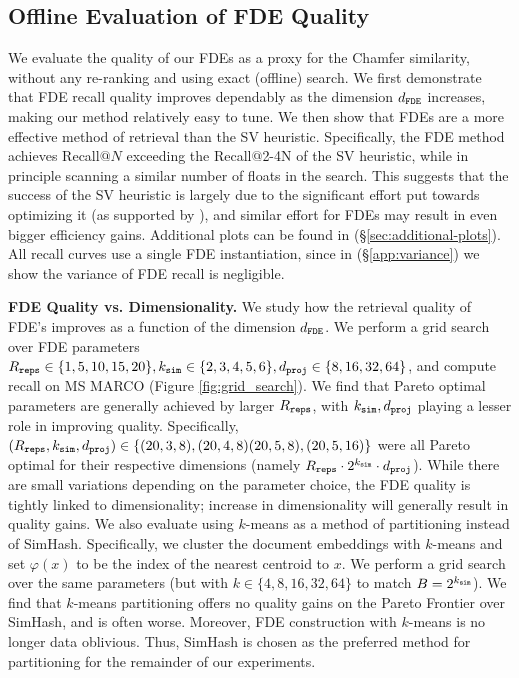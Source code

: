\subsection{Offline Evaluation of FDE Quality}
\label{sec:fde-experimental}
We evaluate the quality of our FDEs as a proxy for the Chamfer similarity, without any re-ranking and using exact (offline) search. We first demonstrate that FDE recall quality improves dependably as the dimension $d_{\texttt{FDE}}$ increases, making our method relatively easy to tune. We then show that FDEs are a more effective method of retrieval than the SV heuristic. Specifically, the FDE method achieves Recall$@N$ exceeding the Recall$@$2-4N of the SV heuristic, while in principle scanning a similar number of floats in the search. This suggests that the success of the SV heuristic is largely due to the significant effort put towards optimizing it (as supported by \cite{macavaney2024reproducibility}), and similar effort for FDEs may result in even bigger efficiency gains. Additional plots can be found in (§\ref{sec:additional-plots}). All recall curves use a single FDE instantiation, since in (§\ref{app:variance}) we show the variance of FDE recall is negligible. 



\textbf{FDE Quality vs. Dimensionality.}
We study how the retrieval quality of FDE's improves as a function of the dimension $d_{\texttt{FDE}}$. We perform a grid search over FDE parameters $R_{\texttt{reps}} \in \{1,5,10,15,20\}, k_{\texttt{sim}} \in \{2,3,4,5,6\}, d_{\texttt{proj}} \in \{8,16,32,64\}$, and compute recall on MS MARCO (Figure \ref{fig:grid_search}). We find that Pareto optimal parameters are generally achieved by larger $R_{\texttt{reps}}$, with $k_{\texttt{sim}},d_{\texttt{proj}}$ playing a lesser role in improving quality. Specifically, $(R_{\texttt{reps}},k_{\texttt{sim}},d_{\texttt{proj}}) \in\{ (20,3,8),(20,4,8)(20,5,8),(20,5,16) \}$ were all Pareto optimal for their respective dimensions (namely $R_{\texttt{reps}} \cdot 2^{k_{\texttt{sim}}} \cdot d_{\texttt{proj}}$).
While there are small variations depending on the parameter choice, the FDE quality is tightly linked to dimensionality; increase in dimensionality will generally result in quality gains. 
We also evaluate using $k$-means as a method of partitioning instead of SimHash. Specifically, we cluster the document embeddings with $k$-means and set $\varphi(x)$ to be the index of the nearest centroid to $x$. We perform a grid search over the same parameters (but with $k \in \{4,8,16,32,64\}$ to match $B = 2^{k_{\texttt{sim}}}$). We find that $k$-means partitioning offers no quality gains on the Pareto Frontier over SimHash, and is often worse.  Moreover, FDE construction with $k$-means is no longer data oblivious. 
Thus, SimHash is chosen as the preferred method for partitioning for the remainder of our experiments. 




